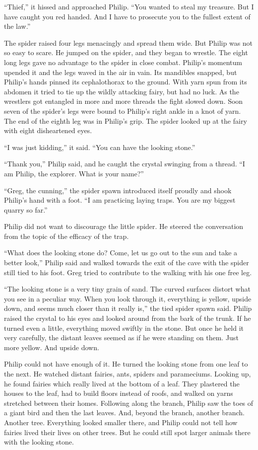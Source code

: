 \documentclass[10pt, draft]{memoir}
\begin{document}
``Thief,'' it hissed and approached Philip. ``You wanted to steal my treasure.
But I have caught you red handed. And I have to prosecute you to the fullest
extent of the law.''

The spider raised four legs menacingly and spread them wide. But Philip was not
so easy to scare. He jumped on the spider, and they began to wrestle. The eight
long legs gave no advantage to the spider in close combat. Philip's momentum
upended it and the legs waved in the air in vain. Its mandibles snapped, but
Philip's hands pinned its cephalothorax to the ground. With yarn spun from its
abdomen it tried to tie up the wildly attacking fairy, but had no luck. As the
wrestlers got entangled in more and more threads the fight slowed down. Soon
seven of the spider's legs were bound to Philip's right ankle in a knot of
yarn. The end of the eighth leg was in Philip's grip. The spider looked up at
the fairy with eight disheartened eyes.

``I was just kidding,'' it said. ``You can have the looking stone.''

``Thank you,'' Philip said, and he caught the crystal swinging from a thread.
``I am Philip, the explorer. What is your name?''

``Greg, the cunning,'' the spider spawn introduced itself proudly and shook
Philip's hand with a foot. ``I am practicing laying traps. You are my biggest
quarry so far.''

Philip did not want to discourage the little spider. He steered the
conversation from the topic of the efficacy of the trap.

``What does the looking stone do? Come, let us go out to the sun and take a
better look,'' Philip said and walked towards the exit of the cave with the
spider still tied to his foot. Greg tried to contribute to the walking with his
one free leg.

``The looking stone is a very tiny grain of sand. The curved surfaces distort
what you see in a peculiar way. When you look through it, everything is yellow,
upside down, and seems much closer than it really is,'' the tied spider spawn
said. Philip raised the crystal to his eyes and looked around from the bark of
the trunk. If he turned even a little, everything moved swiftly in the stone.
But once he held it very carefully, the distant leaves seemed as if he were
standing on them. Just more yellow. And upside down.

Philip could not have enough of it. He turned the looking stone from one leaf
to the next. He watched distant fairies, ants, spiders and parameciums. Looking
up, he found fairies which really lived at the bottom of a leaf. They plastered
the houses to the leaf, had to build floors instead of roofs, and walked on
yarns stretched between their homes. Following along the branch, Philip saw the
toes of a giant bird and then the last leaves. And, beyond the branch, another
branch. Another tree. Everything looked smaller there, and Philip could not
tell how fairies lived their lives on other trees. But he could still spot
larger animals there with the looking stone.
\end{document}
